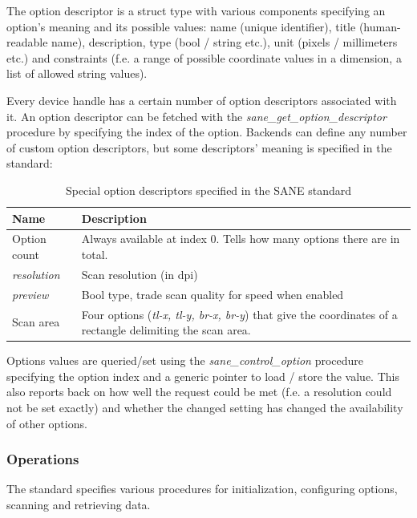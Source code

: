 \documentclass{article}
\begin{document}
The option descriptor is a struct type with various components specifying an option's
meaning and its possible values: name (unique identifier),
title (human-readable name), description, type (bool / string etc.), unit (pixels / millimeters etc.)
and constraints (f.e. a range of possible coordinate values in a dimension,
a list of allowed string values). \cite[4.2.9]{sane_standard}

Every device handle has a certain number of option descriptors associated
with it. An option descriptor can be fetched with the {\it sane\_get\_option\_descriptor}
procedure by specifying the index of the option.
Backends can define any number of custom option descriptors, but some
descriptors' meaning is specified in the standard:

\begin{table}[H]
  \caption{Special option descriptors specified in the SANE standard \cite[4.5]{sane_standard}}
  \centering
  \begin{tabular}{p{3cm} | p{8cm}}
    Name & Description \\ \hline
      Option count & Always available at index 0. Tells how many options
                            there are in total. \\
      {\it resolution} & Scan resolution (in dpi) \\
      {\it preview} & Bool type, trade scan quality for speed when enabled \\
      Scan area & Four options ({\it tl-x, tl-y, br-x, br-y}) that give
                  the coordinates of a rectangle delimiting the scan area. \\
  \end{tabular}
\end{table} 

Options values are queried/set using the {\it sane\_control\_option} procedure
specifying the option index and a generic pointer to load / store the value.
This also reports back on how well the request could be met (f.e. a resolution could
not be set exactly) and whether the changed setting has changed the availability
of other options. \cite[4.4]{sane_standard}

\subsubsection{Operations}

The standard specifies various procedures for initialization, configuring options,
scanning and retrieving data.
\end{document}
